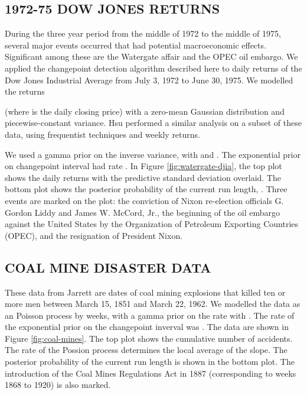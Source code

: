 \documentclass[]{article}
\begin{document}
    \subsection{1972-75 DOW JONES RETURNS}
      During the three year period from the middle of 1972 to the middle of
      1975, several major events occurred that had potential macroeconomic
      effects.  Significant among these are the Watergate affair and the
      OPEC oil embargo.  We applied the changepoint detection algorithm
      described here to daily returns of the Dow Jones Industrial Average
      from July 3, 1972 to June 30, 1975.  We modelled the returns
      
      (where  is the daily closing price) with a zero-mean
      Gaussian distribution and piecewise-constant variance.  Hsu
      \cite{hsu-1977a} performed a similar analysis on a subset of these
      data, using frequentist techniques and weekly returns.

      We used a gamma prior on the inverse variance, with  and
      .  The exponential prior on changepoint interval had rate
      .  In Figure \ref{fig:watergate-djia}, the
      top plot shows the daily returns with the predictive standard
      deviation overlaid.  The bottom plot shows the posterior probability
      of the current run length, .  Three events
      are marked on the plot: the conviction of Nixon re-election officials
      G. Gordon Liddy and James W. McCord, Jr., the beginning of the oil
      embargo against the United States by the Organization of Petroleum
      Exporting Countries (OPEC), and the resignation of President Nixon.

    \subsection{COAL MINE DISASTER DATA}
      These data from Jarrett \cite{jarrett-1979a} are dates of coal mining
      explosions that killed ten or more men between March 15, 1851 and
      March 22, 1962.  We modelled the data as an Poisson process by weeks,
      with a gamma prior on the rate with .  The rate of the
      exponential prior on the changepoint inverval was
      .  The data are shown in Figure
      \ref{fig:coal-mines}.  The top plot shows the cumulative number of
      accidents.  The rate of the Possion process determines the local
      average of the slope.  The posterior probability of the current run
      length is shown in the bottom plot.  The introduction of the Coal
      Mines Regulations Act in 1887 (corresponding to weeks 1868 to 1920)
      is also marked.
\end{document}

